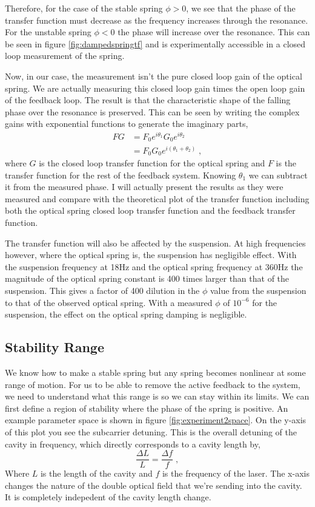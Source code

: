 Therefore, for the case of the stable spring $\phi>0$, we see that the phase of
the transfer function must decrease as the frequency increases through the
resonance.
For the unstable spring $\phi<0$ the phase will increase over the resonance.
This can be seen in figure \ref{fig:dampedspringtf} and is experimentally
accessible in a closed loop measurement of the spring.

Now, in our case, the measurement isn't the pure closed loop gain of the
optical spring.
We are actually measuring this closed loop gain times the open loop gain of the
feedback loop.
The result is that the characteristic shape of the falling phase over the
resonance is preserved.
This can be seen by writing the complex gains with exponential functions to
generate the imaginary parts,
\begin{align}
FG &= F_0e^{i\theta_1}G_0e^{i\theta_2} \nonumber \\
  &= F_0G_0e^{i(\theta_1+\theta_2)} \;,
\end{align}
where $G$ is the closed loop transfer function for the optical spring and
$F$ is the transfer function for the rest of the feedback system.
Knowing $\theta_1$ we can subtract it from the measured phase.
I will actually present the results as they were measured and compare with the
theoretical plot of the transfer function including both the optical spring
closed loop transfer function and the feedback transfer function.

The transfer function will also be affected by the suspension.
At high frequencies however, where the optical spring is, the 
suspension has negligible effect.
With the suspension frequency at 18Hz and the optical spring frequency
at 360Hz the magnitude of the optical spring constant is 400 times larger
than that of the suspension.
This gives a factor of 400 dilution in the $\phi$ value from the suspension
to that of the observed optical spring.
With a measured $\phi$ of $10^{-6}$ for the suspension, the effect
on the optical spring damping is negligible.


\subsection{Stability Range}
\label{sec:results_stability}
We know how to make a stable spring but any spring becomes nonlinear at some
range of motion.
For us to be able to remove the active feedback to the system, we
need to understand what this range is so we can stay within its limits.
We can first define a region of stability where the phase of the spring is
positive.
An example parameter space is shown in figure \ref{fig:experiment2space}.
On the y-axis of this plot you see the subcarrier detuning. This is the
overall detuning of the cavity in frequency, which directly corresponds to
a cavity length by,
\begin{equation}
\frac{\Delta L}{L} = \frac{\Delta f}{f} \label{eq:lengthtofreq} \;,
\end{equation}
Where $L$ is the length of the cavity and $f$ is the frequency of the laser.
The x-axis changes the nature of the double optical field that we're sending
into the cavity.
It is completely indepedent of the cavity length change.

